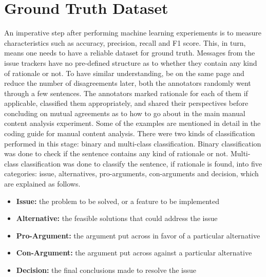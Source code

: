 \documentclass[a4paper,12pt,twoside]{report}
\begin{document}
\section{Ground Truth Dataset}
An imperative step after performing machine learning experiements is to measure characteristics such as accuracy, precision, recall and F1 score. This, in turn, means one needs to have a reliable dataset for ground truth. Messages from the issue trackers have no pre-defined structure as to whether they contain any kind of rationale or not. To have similar understanding, be on the same page and reduce the number of disagreements later, both the annotators randomly went through a few sentences. The annotators marked rationale for each of them if applicable, classified them appropriately, and shared their perspectives before concluding on mutual agreements as to how to go about in the main manual content analysis experiment.  Some of the examples are mentioned in detail in the coding guide for manual content analysis. There were two kinds of classification performed in this stage: binary and multi-class classification. Binary classification was done to check if the sentence contains any kind of rationale or not. Multi-class classification was done to classify the sentence, if rationale is found, into five categories: issue, alternatives, pro-arguments, con-arguments and decision, which are explained as follows.

\begin{itemize}
\item \textbf{Issue:} the problem to be solved, or a feature to be implemented
\item \textbf{Alternative:} the feasible solutions that could address the issue
\item \textbf{Pro-Argument:} the argument put across in favor of a particular alternative
\item \textbf{Con-Argument:} the argument put across against a particular alternative
\item \textbf{Decision:} the final conclusions made to resolve the issue
\end{itemize}
\end{document}
